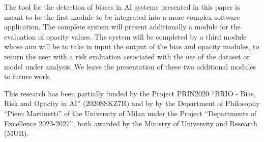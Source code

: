 \documentclass[
]{ceurart}
\begin{document}
The tool for the detection of biases in AI systems presented in this paper is meant to be the first module to be integrated into a more complex software application. The complete system will present additionally a module for the evaluation of opacity values. The system will be completed by a third module whose aim will be to take in input the output of the bias and opacity modules, to return the user with a risk evaluation associated with the use of the dataset or model under analysis. We leave the presentation of these two additional modules to future work.



%
%
%


\begin{acknowledgments}
This research has been partially funded by the Project PRIN2020 ``BRIO - Bias, Risk and Opacity in AI'' (2020SSKZ7R) and by by the Department of Philosophy ``Piero Martinetti'' of the University of Milan under the Project ``Departments of Excellence 2023-2027'', both awarded by the Ministry of University and Research (MUR).
\end{acknowledgments}
\end{document}
